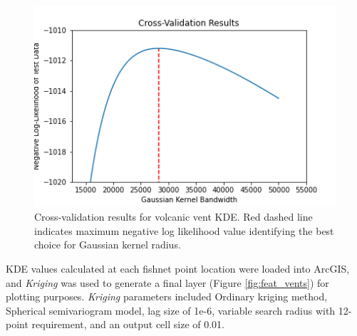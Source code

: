\begin{figure}[!htp]
\centering
\includegraphics[scale=.50]{templates/images/Figure-Vents_kde_gridsearchcv_result.png}
\caption[Volcanic vent density parameter tuning]{Cross-validation results for volcanic vent KDE. Red dashed line indicates maximum negative log likelihood value identifying the best choice for Gaussian kernel radius.}
\label{fig:vent_cv}
\end{figure}

KDE values calculated at each fishnet point location were loaded into ArcGIS, and \textit{Kriging} was used to generate a final layer (Figure \ref{fig:feat_vents}) for plotting purposes. \textit{Kriging} parameters included Ordinary kriging method, Spherical semivariogram model, lag size of 1e-6, variable search radius with 12-point requirement, and an output cell size of 0.01. 

